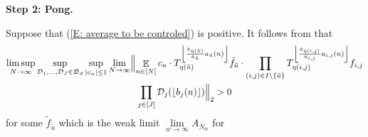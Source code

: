 \documentclass[11pt]{amsart}
\theoremstyle{definition}
\DeclareMathOperator*{\E}{\mathbb{E}}
\newcommand{\CD}{{\mathcal D}}
\newcommand{\FD}{{\mathfrak D}}
\newcommand{\nnorm}[1]{\lvert\!|\!| #1|\!|\!\rvert}
\newcommand{\1}{{\mathbf{1}}}
\newcommand{\floor}[1]{{\left \lfloor #1 \right \rfloor}}
\begin{document}
  \smallskip
         \textbf{Step 2: Pong.} 
        \smallskip
         
     Suppose that  (\ref{E: average to be controled}) is positive. 
      It follows from \cite[Lemma 11.7]{DKKST24} that 
     \begin{multline*}
         \limsup_{N\to\infty}\sup_{\substack{
         \CD_1, \ldots, \CD_J \in \FD_d}} \sup_{|c_n|\leq 1}\lim_{N\to\infty}\Bigl\Vert\E_{n\in[N]}c_{n}\cdot T_{\eta(\tilde{u})}^{\floor{\frac{\hat{a}_{\eta(\tilde{u})}}{\hat{a}_{\tilde{u}}}a_{\tilde{u}}(n)}}\tilde{f}_{\tilde{u}}\cdot\prod_{(i,j)\in I\backslash\{\tilde{u}\}}T_{\eta(i,j)}^{\floor{\frac{\hat{a}_{\eta(i,j)}}{\hat{a}_{i,j}}a_{i,j}(n)}}f_{i,j}\\
         \prod_{j\in[J]}\mathcal{D}_{j}(\floor{b_{j}(n)})\Bigr\Vert_{2}>0
     \end{multline*}
     for some $\tilde{f}_{\tilde{u}}$ which is the weak limit $\lim\limits_{w\to\infty} A_{N_{w}}$ for 
\end{document}
